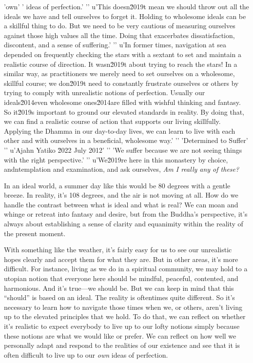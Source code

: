 'own'
' ideas of perfection.'
'\n'
u'This doesn\u2019t mean we should throw out all the ideals we have and tell ourselves to forget it. Holding to wholesome ideals can be a skillful thing to do. But we need to be very cautious of measuring ourselves against those high values all the time. Doing that exacerbates dissatisfaction, discontent, and a sense of suffering.'
'\n'
u'In former times, navigation at sea depended on frequently checking the stars with a sextant to set and maintain a realistic course of direction. It wasn\u2019t about trying to reach the stars! In a similar way, as practitioners we merely need to set ourselves on a wholesome, skillful course; we don\u2019t need to constantly frustrate ourselves or others by trying to comply with unrealistic notions of perfection. Usually our ideals\u2014even wholesome ones\u2014are filled with wishful thinking and fantasy. So it\u2019s important to ground our elevated standards in reality. By doing that, we can find a realistic course of action that supports our living skillfully. Applying the Dhamma in our day-to-day lives, we can learn to live with each other and with ourselves in a beneficial, wholesome way.'
'\n'
'Determined to Suffer'
'\n'
u'Ajahn Yatiko \u2022 July 2012'
'\n'
'We suffer because we are not seeing things with the right perspective.'
'\n'
u'We\u2019re here in this monastery by choice, andntemplation and examination, and ask ourselves, \emph{Am I 
really any of these?}


In an ideal world, a summer day like this would be 80 degrees with a 
gentle breeze. In reality, it's 108 degrees, and the air is not moving 
at all. How do we handle the contrast between what is ideal and what is 
real? We can moan and whinge or retreat into fantasy and desire, but 
from the Buddha's perspective, it's always about establishing a sense 
of clarity and equanimity within the reality of the present moment.

With something like the weather, it's fairly easy for us to see our 
unrealistic hopes clearly and accept them for what they are. But in 
other areas, it's more difficult. For instance, living as we do in a 
spiritual community, we may hold to a utopian notion that everyone here 
should be mindful, peaceful, contented, and harmonious. And it's 
true---we should be. But we can keep in mind that this ``should'' is 
based on an ideal. The reality is oftentimes quite different. So it's 
necessary to learn how to navigate those times when we, or others, 
aren't living up to the elevated principles that we hold. To do that, 
we can reflect on whether it's realistic to expect everybody to live up 
to our lofty notions simply because these notions are what we would 
like or prefer. We can reflect on how well we personally adapt and 
respond to the realities of our existence and see that it is often 
difficult to live up to our \emph{own} ideas of perfection.

